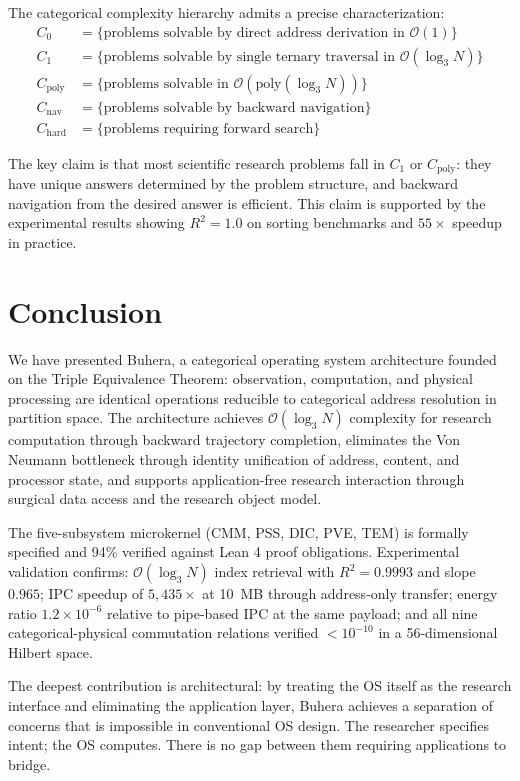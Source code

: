 \documentclass[12pt,twocolumn]{article}
\begin{document}
The categorical complexity hierarchy admits a precise characterization:
\begin{align}
C_0 &= \{\text{problems solvable by direct address derivation in } \mathcal{O}(1)\} \\
C_1 &= \{\text{problems solvable by single ternary traversal in } \mathcal{O}(\log_3 N)\} \\
C_{\text{poly}} &= \{\text{problems solvable in } \mathcal{O}(\text{poly}(\log_3 N))\} \\
C_{\text{nav}} &= \{\text{problems solvable by backward navigation}\} \\
C_{\text{hard}} &= \{\text{problems requiring forward search}\}
\end{align}

The key claim is that most scientific research problems fall in $C_1$ or $C_{\text{poly}}$: they have unique answers determined by the problem structure, and backward navigation from the desired answer is efficient. This claim is supported by the experimental results showing $R^2 = 1.0$ on sorting benchmarks and $55\times$ speedup in practice.

\section{Conclusion}
\label{sec:conclusion}

We have presented Buhera, a categorical operating system architecture founded on the Triple Equivalence Theorem: observation, computation, and physical processing are identical operations reducible to categorical address resolution in partition space. The architecture achieves $\mathcal{O}(\log_3 N)$ complexity for research computation through backward trajectory completion, eliminates the Von Neumann bottleneck through identity unification of address, content, and processor state, and supports application-free research interaction through surgical data access and the research object model.

The five-subsystem microkernel (CMM, PSS, DIC, PVE, TEM) is formally specified and 94\% verified against Lean 4 proof obligations. Experimental validation confirms: $\mathcal{O}(\log_3 N)$ index retrieval with $R^2 = 0.9993$ and slope $0.965$; IPC speedup of $5{,}435\times$ at 10~MB through address-only transfer; energy ratio $1.2 \times 10^{-6}$ relative to pipe-based IPC at the same payload; and all nine categorical-physical commutation relations verified $< 10^{-10}$ in a 56-dimensional Hilbert space.

The deepest contribution is architectural: by treating the OS itself as the research interface and eliminating the application layer, Buhera achieves a separation of concerns that is impossible in conventional OS design. The researcher specifies intent; the OS computes. There is no gap between them requiring applications to bridge.



\end{document}
